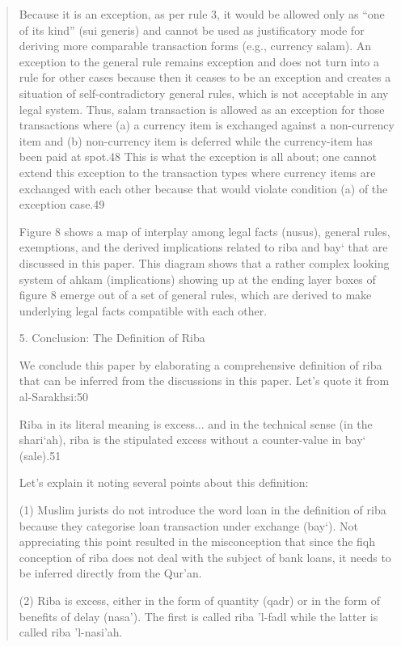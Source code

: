 \begin{quote}
Because it is an exception, as per rule 3, it would be allowed only as “one of its kind” (sui generis) and cannot be used as justificatory mode for deriving more comparable transaction forms (e.g., currency salam). An exception to the general rule remains exception and does not turn into a rule for other cases because then it ceases to be an exception and creates a situation of self-contradictory general rules, which is not acceptable in any legal system. Thus, salam transaction is allowed as an exception for those transactions where (a) a currency item is exchanged against a non-currency item and (b) non-currency item is deferred while the currency-item has been paid at spot.48 This is what the exception is all about; one cannot extend this exception to the transaction types where currency items are exchanged with each other because that would violate condition (a) of the exception case.49

Figure 8 shows a map of interplay among legal facts (nusus), general rules, exemptions, and the derived implications related to riba and bay‘ that are discussed in this paper. This diagram shows that a rather complex looking system of ahkam (implications) showing up at the ending layer boxes of figure 8 emerge out of a set of general rules, which are derived to make underlying legal facts compatible with each other.

5. Conclusion: The Definition of Riba

We conclude this paper by elaborating a comprehensive definition of riba that can be inferred from the discussions in this paper. Let's quote it from al-Sarakhsi:50
\begin{Synthesis}
Riba in its literal meaning is excess... and in the technical sense (in the shari‘ah), riba is the stipulated excess without a counter-value in bay‘ (sale).51
\end{Synthesis}


Let's explain it noting several points about this definition:

(1) Muslim jurists do not introduce the word loan in the definition of riba because they categorise loan transaction under exchange (bay‘). Not appreciating this point resulted in the misconception that since the fiqh conception of riba does not deal with the subject of bank loans, it needs to be inferred directly from the Qur'an.

(2) Riba is excess, either in the form of quantity (qadr) or in the form of benefits of delay (nasa'). The first is called riba 'l-fadl while the latter is called riba 'l-nasi'ah.


\end{quote}
